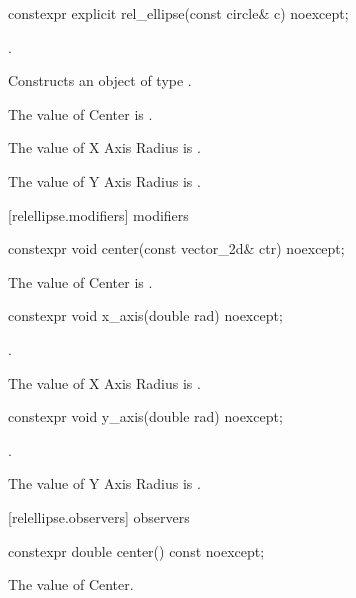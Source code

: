 \begin{itemdecl}
constexpr explicit rel_ellipse(const circle& c) noexcept;
\end{itemdecl}
\begin{itemdescr}
\pnum
\preconditions
{}.

\pnum
\effects
Constructs an object of type .

\pnum
The value of Center is .

\pnum
The value of X Axis Radius is .

\pnum
The value of Y Axis Radius is .
\end{itemdescr}

 [relellipse.modifiers]{ modifiers}

\begin{itemdecl}
constexpr void center(const vector_2d& ctr) noexcept;
\end{itemdecl}

\begin{itemdescr}
\pnum
\effects
The value of Center is .
\end{itemdescr}

\begin{itemdecl}
constexpr void x_axis(double rad) noexcept;
\end{itemdecl}
\begin{itemdescr}
\preconditions
{}.

\pnum
\effects
The value of X Axis Radius is .
\end{itemdescr}

\begin{itemdecl}
constexpr void y_axis(double rad) noexcept;
\end{itemdecl}
\begin{itemdescr}
\preconditions
{}.

\pnum
\effects
The value of Y Axis Radius is .
\end{itemdescr}

 [relellipse.observers]{ observers}

\begin{itemdecl}
constexpr double center() const noexcept;
\end{itemdecl}
\begin{itemdescr}
\pnum
\returns
The value of Center.
\end{itemdescr}

